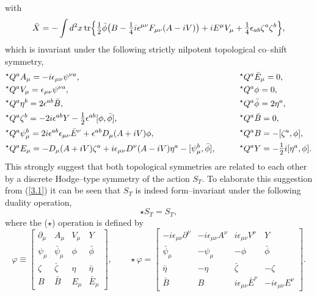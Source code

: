 \documentclass[a4paper,11pt]{article}
\begin{document}
with
\begin{equation*}
\bar{X} = - \int d^2x\, {\rm tr} \Bigr\{
\hbox{\large$\frac{1}{2}$} \bar{\phi} \bigr(
B - \hbox{\large$\frac{1}{4}$} i \epsilon^{\mu\nu} 
F_{\mu\nu}(A - i V) \bigr) + i E^\mu V_\mu +
\hbox{\large$\frac{1}{4}$} \epsilon_{ab} \zeta^a \zeta^b \Bigr\},
\end{equation*}
which is invariant under the following strictly nilpotent topological 
co--shift 
symmetry,
\begin{alignat}{2}
\label{3.3}
&^\star Q^a A_\mu = - i \epsilon_{\mu\nu} \psi^{\nu a},
&\qquad
&^\star Q^a \bar{E}_\mu = 0,
\nonumber
\\
&^\star Q^a V_\mu = \epsilon_{\mu\nu} \psi^{\nu a}, 
&\qquad
&^\star Q^a \phi = 0,
\nonumber
\\
&^\star Q^a \eta^b = 2 \epsilon^{ab} \bar{B},
&\qquad
&^\star Q^a \bar{\phi} = 2 \eta^a,
\nonumber
\\
&^\star Q^a \zeta^b = - 2 i \epsilon^{ab} Y -
\hbox{\large$\frac{1}{2}$} \epsilon^{ab} [ \phi, \bar{\phi} ],
&\qquad
&^\star Q^a \bar{B} = 0,
\nonumber
\\
&^\star Q^a \psi_\mu^b = 2 i \epsilon^{ab} \epsilon_{\mu\nu} \bar{E}^\nu +
\epsilon^{ab} D_\mu(A + i V) \phi,
&\qquad
&^\star Q^a B = - [ \zeta^a, \phi ],
\nonumber
\\
&^\star Q^a E_\mu = - D_\mu(A + i V) \zeta^a +
i \epsilon_{\mu\nu} D^\nu(A - i V) \eta^a - 
[ \psi_\mu^b, \bar{\phi} ],
&\qquad
&^\star Q^a Y = - \hbox{\large$\frac{1}{2}$} i [ \eta^a, \phi ].
\end{alignat}
This strongly suggest that both topological symmetries are related to each 
other by a discrete Hodge--type symmetry of the action $S_T$. To elaborate 
this suggestion from (\ref{3.1}) it can be seen that $S_T$ is indeed 
form--invariant under the following duality operation,   
\begin{equation}
\label{3.4}
\star S_T = S_T,
\end{equation}
where the ($\star$) operation is defined by
\begin{equation}
\label{3.5}
\varphi \equiv \begin{bmatrix} 
\partial_\mu & A_\mu & V_\mu & Y
\\
\psi_\mu & \bar{\psi}_\mu & \phi & \bar{\phi} 
\\ 
\zeta & \bar{\zeta} & \eta & \bar{\eta}       
\\
B & \bar{B} & E_\mu & \bar{E}_\mu
\end{bmatrix},
\qquad
\star \varphi = \begin{bmatrix} 
- i \epsilon_{\mu\nu} \partial^\nu & - i \epsilon_{\mu\nu} A^\nu & 
i \epsilon_{\mu\nu} V^\nu & Y
\\
\bar{\psi}_\mu & - \psi_\mu & - \phi & \bar{\phi} 
\\ 
\bar{\eta} & - \eta & \bar{\zeta} & - \zeta       
\\
\bar{B} & B & i \epsilon_{\mu\nu} \bar{E}^\nu & - i \epsilon_{\mu\nu} E^\nu
\end{bmatrix}.
\end{equation} 
\end{document}
